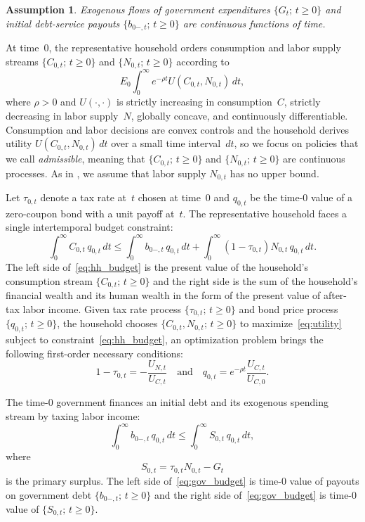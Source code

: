 \documentclass[12pt]{article}
\newtheorem{assumption}{Assumption}
\begin{document}
{\begin{assumption}
	Exogenous flows of government expenditures $\{G_t;\, t \ge 0\}$ and initial  debt-service payouts $\{b_{0-,t};\, t \ge 0\}$ are continuous functions of time.
\end{assumption}

At time~0, the representative household orders consumption and labor supply streams $\{C_{0,t};\, t \ge 0\}$ and $\{N_{0,t};\, t \ge 0\}$ according to
\begin{equation}\label{eq:utility}
E_0 \int_0^\infty e^{-\rho t} U(C_{0,t}, N_{0,t})\, dt,
\end{equation}
where $\rho > 0$ and $U(\cdot,\cdot)$ is strictly increasing in consumption~$C$, strictly decreasing in labor supply~$N$, globally concave, and continuously differentiable. Consumption and labor decisions are convex controls and the household derives utility $U(C_{0,t}, N_{0,t})\,dt$ over a small time interval~$dt$, so we focus on {policies that we call \emph{admissible}, meaning that} $\{C_{0,t};\, t \ge 0\}$ and $\{N_{0,t};\, t \ge 0\}$ are continuous processes. As in \cite*{debortoli2021optimal}, we assume that labor supply $N_{0,t}$ has no upper bound.

Let $\tau_{0,t}$ denote a tax rate at~$t$ chosen at time~0 and $q_{0,t}$ be the time-0 value of a zero-coupon bond with a unit payoff at~$t$. 
The representative household faces a single intertemporal budget constraint:
\begin{equation}\label{eq:hh_budget}
\int_0^\infty C_{0,t}\, q_{0,t}\, dt \le \int_0^\infty b_{0-,t}\, q_{0,t}\, dt + \int_0^\infty (1-\tau_{0,t}) N_{0,t}\, q_{0,t}\, dt.
\end{equation}
The left side of~\eqref{eq:hh_budget} is the present value of the household's consumption stream $\{C_{0,t};\, t \ge 0\}$ and the right side is the sum of the household's financial wealth and its human wealth in the form of the present value of after-tax labor income. Given tax rate process $\{\tau_{0,t};\, t \ge 0\}$ and bond price process $\{q_{0,t};\, t \ge 0\}$, the household chooses $\{C_{0,t}, N_{0,t};\, t \ge 0\}$ to maximize~\eqref{eq:utility} subject to constraint~\eqref{eq:hh_budget}, an optimization problem brings the following first-order necessary conditions:
\begin{equation}\label{eq:foc}
1-\tau_{0,t} = -\frac{U_{N,t}}{U_{C,t}} \quad \text{and} \quad q_{0,t} = e^{-\rho t}\frac{U_{C,t}}{U_{C,0}}.
\end{equation}

The time-0 government finances an initial debt and its exogenous spending stream by taxing labor income:
\begin{equation}\label{eq:gov_budget}
\int_0^\infty b_{0-,t}\, q_{0,t}\, dt \le \int_0^\infty S_{0,t}\, q_{0,t}\, dt,
\end{equation}
where
\begin{equation}\label{eq:surplus}
S_{0,t} = \tau_{0,t} N_{0,t} - G_t
\end{equation}
is the primary surplus. The left side of~\eqref{eq:gov_budget} is time-0 value of payouts on government debt $\{b_{0-,t};\, t \ge 0\}$ and the right side of~\eqref{eq:gov_budget} is time-0 value of $\{S_{0,t};\, t \ge 0\}$.


}
\end{document}
